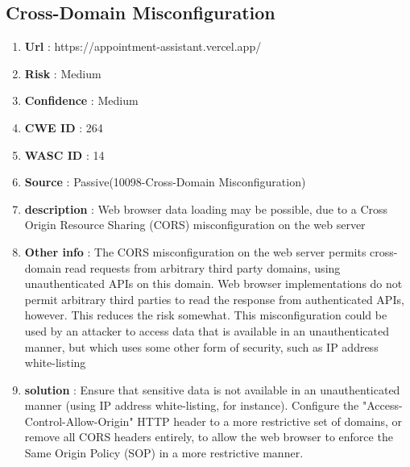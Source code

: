 \documentclass[openany]{report}
\begin{document}
\subsection{Cross-Domain Misconfiguration
}
\begin{enumerate}
    \item \textbf{Url} : https://appointment-assistant.vercel.app/
    \item \textbf{Risk} : Medium
    \item \textbf{Confidence} : Medium
    \item \textbf{CWE ID} : 264
    \item \textbf{WASC ID} : 14
    \item \textbf{Source} : Passive(10098-Cross-Domain Misconfiguration)
    \item \textbf{description} : Web browser data loading may be possible, due to a Cross Origin Resource Sharing (CORS) misconfiguration on the web server
    \item \textbf{Other info} : The CORS misconfiguration on the web server permits cross-domain read requests from arbitrary third party domains, using unauthenticated APIs on this domain. Web browser implementations do not permit arbitrary third parties to read the response from authenticated APIs, however. This reduces the risk somewhat. This misconfiguration could be used by an attacker to access data that is available in an unauthenticated manner, but which uses some other form of security, such as IP address white-listing
    \item \textbf{solution} :  Ensure that sensitive data is not available in an unauthenticated manner (using IP address white-listing, for instance). Configure the "Access-Control-Allow-Origin" HTTP header to a more restrictive set of domains, or remove all CORS headers entirely, to allow the web browser to enforce the Same Origin Policy (SOP) in a more restrictive manner.


\end{enumerate}
\end{document}
